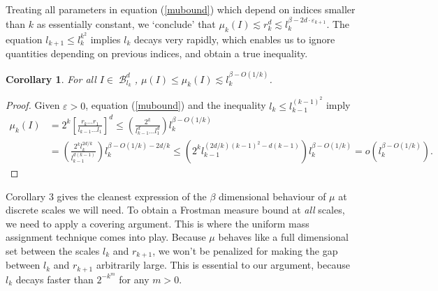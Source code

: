 \documentclass[dvipsnames,letterpaper,12pt]{article}
\theoremstyle{plain}
\newtheorem{corollary}{Corollary}
\DeclareMathOperator{\B}{\mathcal{B}}
\begin{document}
Treating all parameters in equation (\ref{mubound}) which depend on indices smaller than $k$ as essentially constant, we `conclude' that $\mu_k(I) \lesssim r_k^d \lesssim l_k^{\beta - 2d \cdot \varepsilon_{k+1}}$. The equation $l_{k+1} \leq l_k^{k^2}$ implies $l_k$ decays very rapidly, which enables us to ignore quantities depending on previous indices, and obtain a true inequality.

\begin{corollary}
	For all $I \in \B^d_{l_k}$, $\mu(I) \leq \mu_k(I) \lesssim l_k^{\beta - O(1/k)}$.
\end{corollary}
\begin{proof}
	Given $\varepsilon > 0$, equation (\ref{mubound}) and the inequality $l_k \leq l_{k-1}^{(k-1)^2}$ imply
	\begin{align*}
		\mu_k(I) &= 2^k \left[ \frac{r_k \dots r_1}{l_{k-1} \dots l_1} \right]^d \leq \left( \frac{2^k}{l_{k-1}^d \dots l_1^d} \right) l_k^{\beta - O(1/k)}\\
		&= \left( \frac{2^k l_k^{2d/k}}{l_{k-1}^{d(k-1)}} \right) l_k^{\beta - O(1/k) - 2d/k} \leq \left( 2^k l_{k-1}^{(2d/k)(k-1)^2 - d(k-1)} \right) l_k^{\beta - O(1/k)} = o(l_k^{\beta - O(1/k)}). \tag*{\qedhere}
	\end{align*}
\end{proof}

Corollary 3 gives the cleanest expression of the $\beta$ dimensional behaviour of $\mu$ at discrete scales we will need. To obtain a Frostman measure bound at {\it all} scales, we need to apply a covering argument. This is where the uniform mass assignment technique comes into play. Because $\mu$ behaves like a full dimensional set between the scales $l_k$ and $r_{k+1}$, we won't be penalized for making the gap between $l_k$ and $r_{k+1}$ arbitrarily large. This is essential to our argument, because $l_k$ decays faster than $2^{-k^m}$ for any $m > 0$.
\end{document}
